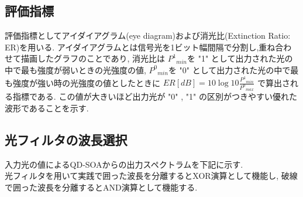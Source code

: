 \documentclass[dvipdfmx]{ujarticle}
\begin{document}
\subsection{評価指標}
評価指標としてアイダイアグラム(eye diagram)および消光比(Extinction Ratio: ER)を用いる.
アイダイアグラムとは信号光を1ビット幅間隔で分割し,重ね合わせて描画したグラフのことであり,
消光比は ${P^1}_{min}$を "1" として出力された光の中で最も強度が弱いときの光強度の値,
${P^0}_{min}$を "0" として出力された光の中で最も強度が強い時の光強度の値としたときに
$ER[dB] = 10 \log{10}{\frac{{P^1}_{min}}{{P^0}_{max}}}$ で算出される指標である.
この値が大きいほど出力光が "0" , "1" の区別がつきやすい優れた波形であることを示す.

\subsection{光フィルタの波長選択}
入力光の値によるQD-SOAからの出力スペクトラムを下記に示す. \\
光フィルタを用いて実践で囲った波長を分離するとXOR演算として機能し, 破線で囲った波長を分離するとAND演算として機能する.
\end{document}
